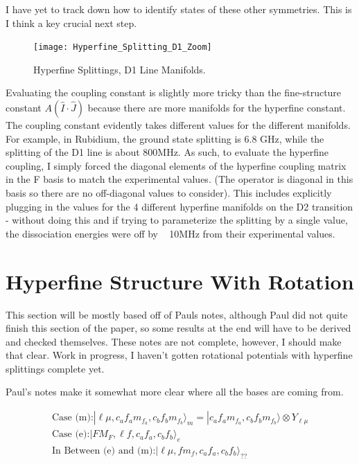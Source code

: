 \documentclass[prl, longbibliography]{revtex4-2}
\begin{document}
I have yet to track down how to identify states of these other symmetries. This is I think a key crucial next step.

\begin{figure}
  \centering
    \texttt{[image: Hyperfine\_Splitting\_D1\_Zoom]}
    \caption{Hyperfine Splittings, D1 Line Manifolds. }
\end{figure}

Evaluating the coupling constant is slightly more tricky than the fine-structure constant $A(\hat{I}\cdot\hat{J})$ because there are more manifolds for the hyperfine constant. The coupling constant evidently takes different values for the different manifolds. For example, in Rubidium, the ground state splitting is 6.8 GHz, while the splitting of the D1 line is about 800MHz. As such, to evaluate the hyperfine coupling, I simply forced the diagonal elements of the hyperfine coupling matrix in the F basis to match the experimental values. (The operator is diagonal in this basis so there are no off-diagonal values to consider).  This includes explicitly plugging in the values for the 4 different hyperfine manifolds on the D2 transition - without doing this and if trying to parameterize the splitting by a single value, the dissociation energies were off by ~ 10MHz from their experimental values. 

\section{Hyperfine Structure With Rotation} 

This section will be mostly based off of Pauls notes, although Paul did not quite finish this section of the paper, so some results at the end will have to be derived and checked themselves. These notes are not complete, however, I should make that clear. Work in progress, I haven't gotten rotational potentials with hyperfine splittings complete yet. 

Paul's notes make it somewhat more clear where all the bases are coming from. 

\begin{equation}
\begin{split}
\text{Case (m):} |\ell \mu, c_a f_a m_{f_a}, c_b f_b m_{f_b}\rangle_m = |c_a f_a m_{f_a}, c_b f_b m_{f_b}\rangle\otimes Y_{\ell \mu}\\
\text{Case (e):} |F M_F, \ell f, c_a f_a, c_b f_b\rangle_e\\
\text{In Between (e) and (m):} |\ell\mu, f m_f, c_a f_a, c_b f_b\rangle_{??}
\end{split}
\end{equation}
\end{document}
